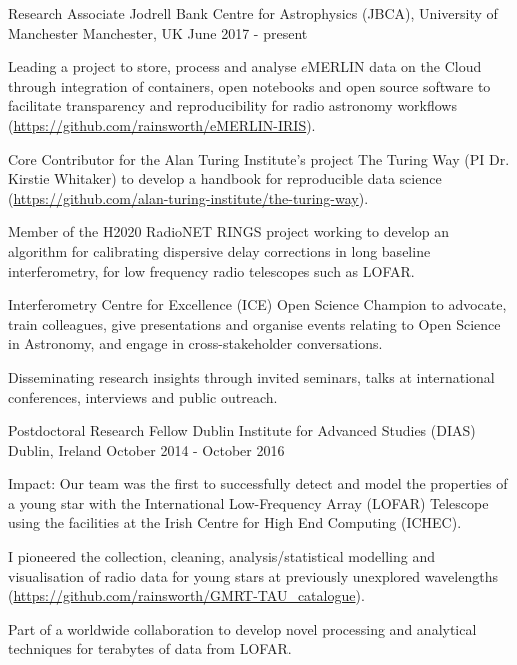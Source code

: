 \begin{cventries}
  \cventry
    {Research Associate}
    {Jodrell Bank Centre for Astrophysics (JBCA), University of Manchester}
    {Manchester, UK}
    {June 2017 - present}
    {
      \begin{cvitems}
        \item {Leading a project to store, process and analyse $e$MERLIN data on the Cloud through integration of containers, open notebooks and open source software to facilitate transparency and reproducibility for radio astronomy workflows (\url{https://github.com/rainsworth/eMERLIN-IRIS}).}
        \item {Core Contributor for the Alan Turing Institute's project The Turing Way (PI Dr. Kirstie Whitaker) to develop a handbook for reproducible data science (\url{https://github.com/alan-turing-institute/the-turing-way}).}
        \item {Member of the H2020 RadioNET RINGS project working to develop an algorithm for calibrating dispersive delay corrections in long baseline interferometry, for low frequency radio telescopes such as LOFAR.}
        \item {Interferometry Centre for Excellence (ICE) Open Science Champion to advocate, train colleagues, give presentations and organise events relating to Open Science in Astronomy, and engage in cross-stakeholder conversations.}
        \item {Disseminating research insights through invited seminars, talks at international conferences, interviews and public outreach.}
      \end{cvitems}
    }
\cventry
    {Postdoctoral Research Fellow}
    {Dublin Institute for Advanced Studies (DIAS)}
    {Dublin, Ireland}
    {October 2014 - October 2016}
    {
      \begin{cvitems}
        \item{Impact: Our team was the first to successfully detect and model the properties of a young star with the International Low-Frequency Array (LOFAR) Telescope using the facilities at the Irish Centre for High End Computing (ICHEC).}        
        \item {I pioneered the collection, cleaning, analysis/statistical modelling and visualisation of radio data for young stars at previously unexplored wavelengths (\url{https://github.com/rainsworth/GMRT-TAU_catalogue}).}
        \item {Part of a worldwide collaboration to develop novel processing and analytical techniques for terabytes of data from LOFAR.}

\end{cvitems}}
\end{cventries}
